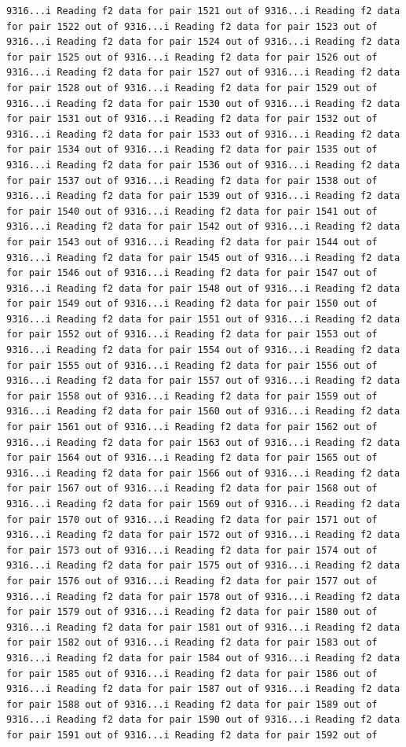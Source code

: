 \documentclass[
]{article}
\begin{document}
\begin{verbatim}
9316...i Reading f2 data for pair 1521 out of 9316...i Reading f2 data for pair 1522 out of 9316...i Reading f2 data for pair 1523 out of 9316...i Reading f2 data for pair 1524 out of 9316...i Reading f2 data for pair 1525 out of 9316...i Reading f2 data for pair 1526 out of 9316...i Reading f2 data for pair 1527 out of 9316...i Reading f2 data for pair 1528 out of 9316...i Reading f2 data for pair 1529 out of 9316...i Reading f2 data for pair 1530 out of 9316...i Reading f2 data for pair 1531 out of 9316...i Reading f2 data for pair 1532 out of 9316...i Reading f2 data for pair 1533 out of 9316...i Reading f2 data for pair 1534 out of 9316...i Reading f2 data for pair 1535 out of 9316...i Reading f2 data for pair 1536 out of 9316...i Reading f2 data for pair 1537 out of 9316...i Reading f2 data for pair 1538 out of 9316...i Reading f2 data for pair 1539 out of 9316...i Reading f2 data for pair 1540 out of 9316...i Reading f2 data for pair 1541 out of 9316...i Reading f2 data for pair 1542 out of 9316...i Reading f2 data for pair 1543 out of 9316...i Reading f2 data for pair 1544 out of 9316...i Reading f2 data for pair 1545 out of 9316...i Reading f2 data for pair 1546 out of 9316...i Reading f2 data for pair 1547 out of 9316...i Reading f2 data for pair 1548 out of 9316...i Reading f2 data for pair 1549 out of 9316...i Reading f2 data for pair 1550 out of 9316...i Reading f2 data for pair 1551 out of 9316...i Reading f2 data for pair 1552 out of 9316...i Reading f2 data for pair 1553 out of 9316...i Reading f2 data for pair 1554 out of 9316...i Reading f2 data for pair 1555 out of 9316...i Reading f2 data for pair 1556 out of 9316...i Reading f2 data for pair 1557 out of 9316...i Reading f2 data for pair 1558 out of 9316...i Reading f2 data for pair 1559 out of 9316...i Reading f2 data for pair 1560 out of 9316...i Reading f2 data for pair 1561 out of 9316...i Reading f2 data for pair 1562 out of 9316...i Reading f2 data for pair 1563 out of 9316...i Reading f2 data for pair 1564 out of 9316...i Reading f2 data for pair 1565 out of 9316...i Reading f2 data for pair 1566 out of 9316...i Reading f2 data for pair 1567 out of 9316...i Reading f2 data for pair 1568 out of 9316...i Reading f2 data for pair 1569 out of 9316...i Reading f2 data for pair 1570 out of 9316...i Reading f2 data for pair 1571 out of 9316...i Reading f2 data for pair 1572 out of 9316...i Reading f2 data for pair 1573 out of 9316...i Reading f2 data for pair 1574 out of 9316...i Reading f2 data for pair 1575 out of 9316...i Reading f2 data for pair 1576 out of 9316...i Reading f2 data for pair 1577 out of 9316...i Reading f2 data for pair 1578 out of 9316...i Reading f2 data for pair 1579 out of 9316...i Reading f2 data for pair 1580 out of 9316...i Reading f2 data for pair 1581 out of 9316...i Reading f2 data for pair 1582 out of 9316...i Reading f2 data for pair 1583 out of 9316...i Reading f2 data for pair 1584 out of 9316...i Reading f2 data for pair 1585 out of 9316...i Reading f2 data for pair 1586 out of 9316...i Reading f2 data for pair 1587 out of 9316...i Reading f2 data for pair 1588 out of 9316...i Reading f2 data for pair 1589 out of 9316...i Reading f2 data for pair 1590 out of 9316...i Reading f2 data for pair 1591 out of 9316...i Reading f2 data for pair 1592 out of 
\end{verbatim}
\end{document}
